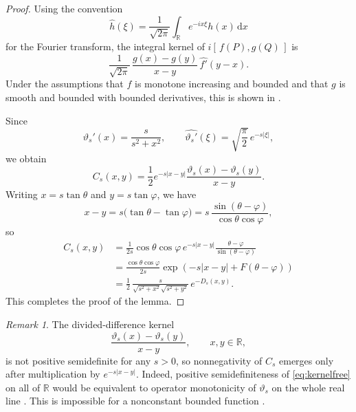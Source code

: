 \documentclass[11pt]{article}
\theoremstyle{definition}
\theoremstyle{remark}
\newtheorem{remark}[theorem]{Remark}
\newcommand{\R}{\mathbb{R}}
\newcommand{\abs}[1]{\left\lvert #1\right\rvert}
\newcommand{\dd}{\,\mathrm{d}}
\begin{document}
\begin{proof}
Using the convention
\begin{equation}\label{eq:Fourier-convention}
\widehat h(\xi)=\frac{1}{\sqrt{2\pi}}
\int_{\R}e^{-ix\xi}h(x)\dd x
\end{equation}
for the Fourier transform, the integral kernel of
$i[\,f(P),g(Q)\,]$ is
\begin{equation}\label{eq:general-kernel}
\frac{1}{\sqrt{2\pi}}\,
\frac{g(x)-g(y)}{x-y}\,\widehat{f'}(y-x).
\end{equation}
Under the assumptions that $f$ is monotone increasing and bounded and
that $g$ is smooth and bounded with bounded derivatives, this is shown
in \cite[Lemma~3.3]{HerbstKriete}.

Since
\[
\vartheta_s'(x)=\frac{s}{s^2+x^2},
\qquad
\widehat{\vartheta_s'}(\xi)=\sqrt{\frac\pi2}\,e^{-s|\xi|},
\]
we obtain
\begin{equation}\label{eq:Cs-kernel}
C_s(x,y)=\frac12e^{-s\abs{x-y}}
\frac{\vartheta_s(x)-\vartheta_s(y)}{x-y}.
\end{equation}
Writing $x=s\tan\theta$ and $y=s\tan\varphi$, we have
\begin{equation}\label{eq:tan-difference}
x-y=s\bigl(\tan\theta-\tan\varphi\bigr)
=s\,\frac{\sin(\theta-\varphi)}{\cos\theta\cos\varphi},
\end{equation}
so
\begin{align*}
C_s(x,y)
&=\frac{1}{2s}\cos\theta\cos\varphi\,e^{-s\abs{x-y}}
\frac{\theta-\varphi}{\sin(\theta-\varphi)}\\
&=\frac{\cos\theta\cos\varphi}{2s}
\exp\!\left(-s\abs{x-y}+F(\theta-\varphi)\right)\\
&=\frac12\,
\frac{s}{\sqrt{s^2+x^2}\sqrt{s^2+y^2}}\,e^{-D_s(x,y)}.
\end{align*}
This completes the proof of the lemma.
\end{proof}

\begin{remark}
The divided-difference kernel
\begin{equation}\label{eq:kernelfree}
\frac{\vartheta_s(x)-\vartheta_s(y)}{x-y},
\qquad x,y\in\R,
\end{equation}
is not positive semidefinite for any $s>0$, so nonnegativity of
$C_s$ emerges only after multiplication by $e^{-s\abs{x-y}}$.  Indeed,
positive semidefiniteness of \eqref{eq:kernelfree} on all of $\R$ would
be equivalent to operator monotonicity of $\vartheta_s$ on the whole
real line \cite[Theorem~5.1]{Simon2}.  This is
impossible for a nonconstant bounded function
\cite[Theorem~1.1]{Simon2}.
\end{remark}
\end{document}
